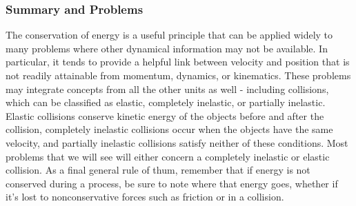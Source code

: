 \subsubsection{Summary and Problems}
The conservation of energy is a useful principle that can be applied widely to many problems where other dynamical information may not be available. In particular, it tends to provide a helpful link between velocity and position that is not readily attainable from momentum, dynamics, or kinematics. These problems may integrate concepts from all the other units as well - including collisions, which can be classified as elastic, completely inelastic, or partially inelastic. Elastic collisions conserve kinetic energy of the objects before and after the collision, completely inelastic collisions occur when the objects have the same velocity, and partially inelastic collisions satisfy neither of these conditions. Most problems that we will see will either concern a completely inelastic or elastic collision. As a final general rule of thum, remember that if energy is not conserved during a process, be sure to note where that energy goes, whether if it's lost to nonconservative forces such as friction or in a collision. \\

